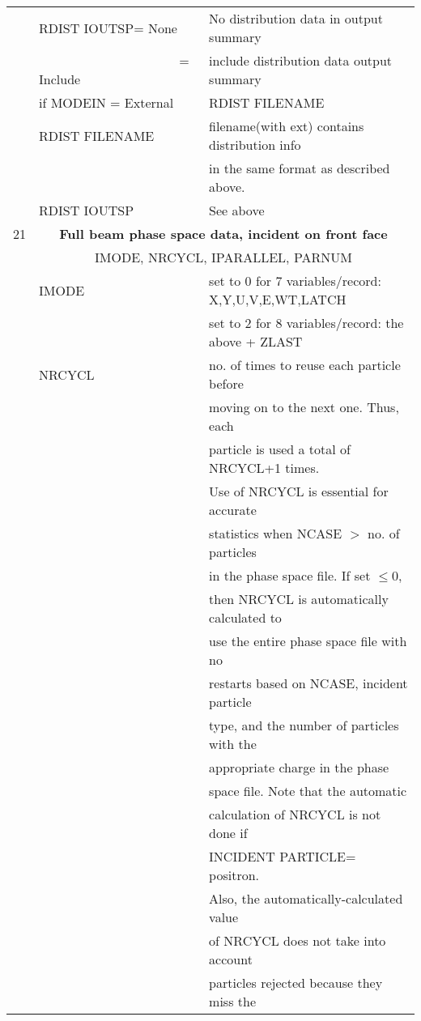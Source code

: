 \begin{longtable}{lll}
  & RDIST IOUTSP= None & No distribution data in output summary\\
  & ~~~~~~~~~~~~~~~~~~~~~ = Include & include distribution data output summary\\
  &if MODEIN = External & RDIST FILENAME \\
  & RDIST FILENAME     & filename(with ext) contains  distribution info\\
  &                   & in the same format as described above.\\
  & RDIST IOUTSP & See above\\
\hline
21&\multicolumn{2}{c}{\bf Full beam phase space data, incident on front face}\\
  &\multicolumn{2}{c}{IMODE, NRCYCL, IPARALLEL, PARNUM}\\
  & IMODE & set to 0 for 7 variables/record: X,Y,U,V,E,WT,LATCH \\
  &  & set to 2 for 8 variables/record: the above + ZLAST \\
  & NRCYCL  & no. of times to reuse each particle before\\
  &         & moving on to the next one.  Thus, each\\
  &         & particle is used a total of NRCYCL+1 times.\\
  &         &  Use of NRCYCL is essential for accurate\\
  &         & statistics when NCASE $>$ no. of particles\\
  &         & in the phase space file.  If set $\leq$0,\\
  &         & then NRCYCL is automatically calculated to\\
  &         & use the entire phase space file with no\\
  &         & restarts based on NCASE, incident particle\\
  &         & type, and the number of particles with the\\
  &         & appropriate charge in the phase\\
  &         & space file.  Note that the automatic\\
  &         & calculation of NRCYCL is not done if\\
  &         & INCIDENT PARTICLE= positron.\\
  &         & Also, the automatically-calculated value\\
  &         & of NRCYCL does not take into account\\
  &         & particles rejected because they miss the\\

\end{longtable}
